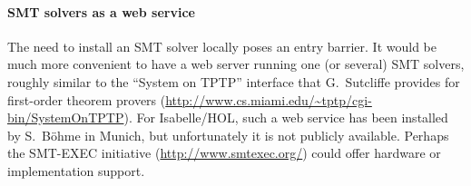 \paragraph{SMT solvers as a web service}

The need to install an SMT solver locally poses an entry barrier.  It
would be much more convenient to have a web server running one (or
several) SMT solvers, roughly similar to the ``System on TPTP''
interface that G.~Sutcliffe provides for first-order theorem provers
(\url{http://www.cs.miami.edu/~tptp/cgi-bin/SystemOnTPTP}).  For
Isabelle/HOL, such a web service has been installed by S.~B{\"o}hme in
Munich, but unfortunately it is not publicly available.  Perhaps the
SMT-EXEC initiative (\url{http://www.smtexec.org/}) could offer
hardware or implementation support.


